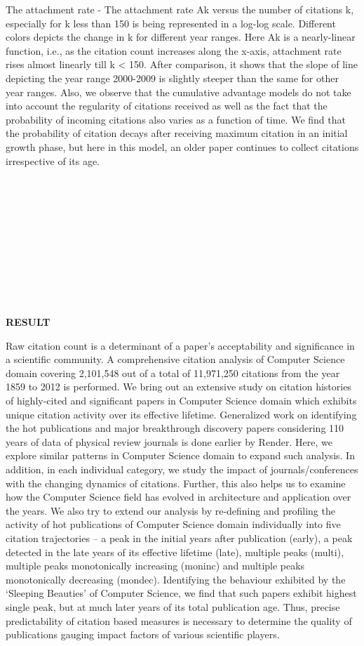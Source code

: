 The attachment rate - The attachment rate Ak versus the number of citations k, especially for k less than 150 is being represented in a log-log scale. Different colors depicts the change in k for different year ranges. Here Ak is a nearly-linear function, i.e., as the citation count increases along the x-axis, attachment rate rises almost linearly till k < 150. After comparison, it shows that the slope of line depicting the year range 2000-2009 is slightly steeper than the same for other year ranges. Also, we observe that the cumulative advantage models do not take into account the regularity of citations received as well as the fact that the probability of incoming citations also varies as a function of time. We find that the probability of citation decays after receiving maximum citation in an initial growth phase, but here in this model, an older paper continues to collect citations irrespective of its age.
\\\\\\\\\\\\\\\\\\\\

\\
\begin{center}
    \large \textbf{RESULT}
\end{center}
Raw citation count is a determinant of a paper’s acceptability and significance in a scientific community. A comprehensive citation analysis of Computer Science domain covering 2,101,548 out of a total of 11,971,250 citations from the year 1859 to 2012 is performed. We bring out an extensive study on citation histories of highly-cited and significant papers in Computer Science domain which exhibits unique citation activity over its effective lifetime. Generalized work on identifying the hot publications and major breakthrough discovery papers considering 110 years of data of physical review journals is done earlier by Render. Here, we explore similar patterns in Computer Science domain to expand such analysis. In addition, in each individual category, we study the impact of journals/conferences with the changing dynamics of citations. Further, this also helps us to examine how the Computer Science field has evolved in architecture and application over the years. We also try to extend our analysis by re-defining and profiling the activity of hot publications of Computer Science domain individually into five citation trajectories – a peak in the initial years after publication (early), a peak detected in the late years of its effective lifetime (late), multiple peaks (multi), multiple peaks monotonically increasing (moninc) and multiple peaks monotonically decreasing (mondec). Identifying the behaviour exhibited by the ‘Sleeping Beauties’ of Computer Science, we find that such papers exhibit highest single peak, but at much later years of its total publication age. Thus, precise predictability of citation based measures is necessary to determine the quality of publications gauging impact factors of various scientific players.


